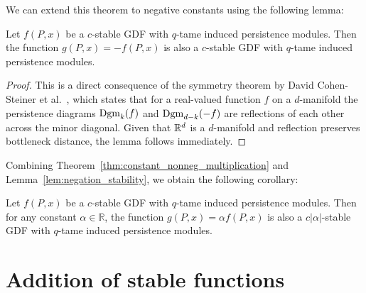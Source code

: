 We can extend this theorem to negative constants using the following lemma:
\begin{lemma}
    \label{lem:negation_stability}
    Let $f(P, x)$ be a $c$-stable GDF with $q$-tame induced persistence modules.
    Then the function $g(P, x) = - f(P, x)$ is also a $c$-stable GDF
    with $q$-tame induced persistence modules.
\end{lemma}
\begin{proof}
    This is a direct consequence of the symmetry theorem by David Cohen-Steiner
    et al.~\cite{cohen2009extending}, which states that for a real-valued
    function $f$ on a $d$-manifold the persistence diagrams $\operatorname{Dgm}_k(f)$ and
    $\operatorname{Dgm}_{d - k}(-f)$ are reflections of each other across the minor diagonal.
    Given that $\mathbb{R}^d$ is a $d$-manifold and reflection preserves bottleneck
    distance, the lemma follows immediately.
\end{proof}

Combining Theorem~\ref{thm:constant_nonneg_multiplication} and
Lemma~\ref{lem:negation_stability}, we obtain the following corollary:
\begin{corollary}
    \label{cor:constant_multiplication}
    Let $f(P, x)$ be a $c$-stable GDF with $q$-tame induced persistence modules.
    Then for any constant $\alpha \in \mathbb{R}$, the function
    $g(P, x) = \alpha f(P, x)$ is also a $c|\alpha|$-stable GDF with
    $q$-tame induced persistence modules.
\end{corollary}

\section{Addition of stable functions}
\label{sec:addition_stable}

